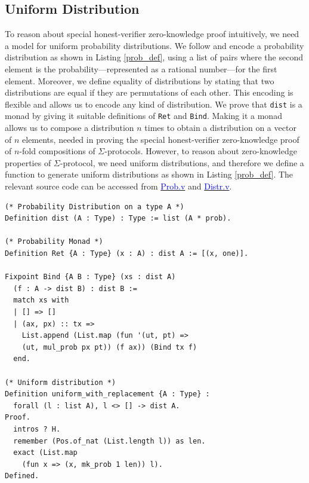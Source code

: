\documentclass[sigconf, anonymous]{acmart}
\begin{document}
\subsection{Uniform Distribution}
To reason about special honest-verifier zero-knowledge proof 
intuitively, we need a model for uniform probability distributions. 
We follow \cite{erwig2006functional}  and 
encode a probability distribution as shown in Listing \ref{prob_def}, using a list of pairs where the 
second element is the probability---represented as 
a rational number---for the first element.
Moreover, we define equality of distributions by 
stating that two distributions are equal if they are permutations 
of each other. This encoding is flexible and allows us 
to encode any kind of distribution. We prove that \texttt{dist} is a 
monad \cite{erwig2006functional} by 
giving it suitable definitions of \texttt{Ret} and 
\texttt{Bind}. Making it a monad allows us 
to compose a distribution $n$ times to 
obtain a distribution on a vector of $n$ elements, 
needed in proving the special honest-verifier 
zero-knowledge proof of $n$-fold compositions of $\Sigma$-protocols.
However, to reason about zero-knowledge properties of $\Sigma$-protocol, we need uniform 
distributions, and therefore we define a function 
\texttt{} to generate uniform distributions as shown in Listing \ref{prob_def}.
The relevant source code can be accessed from \href{https://anonymous.4open.science/r/SigmaProtocol-EBA5/src/Probability/Prob.v}{\textcolor{blue}{Prob.v}} and \href{https://anonymous.4open.science/r/SigmaProtocol-EBA5/src/Probability/Distr.v}{\textcolor{blue}{Distr.v}}.

\begin{lstlisting}[frame=single, language=Coq, caption={Uniform Probability Distribution},
    label={prob_def},captionpos=t, basicstyle=\ttfamily\footnotesize,
    abovecaptionskip=-\medskipamount]
(* Probability Distribution on a type A *)
Definition dist (A : Type) : Type := list (A * prob).
  
(* Probability Monad *)
Definition Ret {A : Type} (x : A) : dist A := [(x, one)].

Fixpoint Bind {A B : Type} (xs : dist A)  
  (f : A -> dist B) : dist B := 
  match xs with 
  | [] => [] 
  | (ax, px) :: tx => 
    List.append (List.map (fun '(ut, pt) => 
    (ut, mul_prob px pt)) (f ax)) (Bind tx f)
  end.

(* Uniform distribution *)
Definition uniform_with_replacement {A : Type} : 
  forall (l : list A), l <> [] -> dist A.
Proof.
  intros ? H.
  remember (Pos.of_nat (List.length l)) as len.
  exact (List.map 
    (fun x => (x, mk_prob 1 len)) l).
Defined.
\end{lstlisting}
\end{document}
